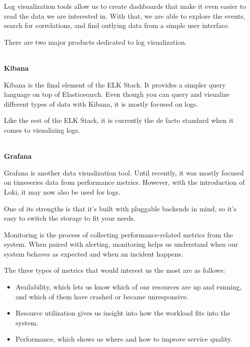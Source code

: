 Log visualization tools allow us to create dashboards that make it even easier to read the data we are interested in. With that, we are able to explore the events, search for correlations, and find outlying data from a simple user interface.

There are two major products dedicated to log visualization.

\hspace*{\fill} \\ %
\noindent
\textbf{Kibana}

Kibana is the final element of the ELK Stack. It provides a simpler query language on top of Elasticsearch. Even though you can query and visualize different types of data with Kibana, it is mostly focused on logs.

Like the rest of the ELK Stack, it is currently the de facto standard when it comes to visualizing logs.

\hspace*{\fill} \\ %
\noindent
\textbf{Grafana}

Grafana is another data visualization tool. Until recently, it was mostly focused on timeseries data from performance metrics. However, with the introduction of Loki, it may now also be used for logs.

One of its strengths is that it’s built with pluggable backends in mind, so it’s easy to switch the storage to fit your needs.


Monitoring is the process of collecting performance-related metrics from the system. When paired with alerting, monitoring helps us understand when our system behaves as expected and when an incident happens.

The three types of metrics that would interest us the most are as follows:

\begin{itemize}
\item 
Availability, which lets us know which of our resources are up and running, and which of them have crashed or became unresponsive.

\item 
Resource utilization gives us insight into how the workload fits into the system.

\item 
Performance, which shows us where and how to improve service quality.
\end{itemize}

